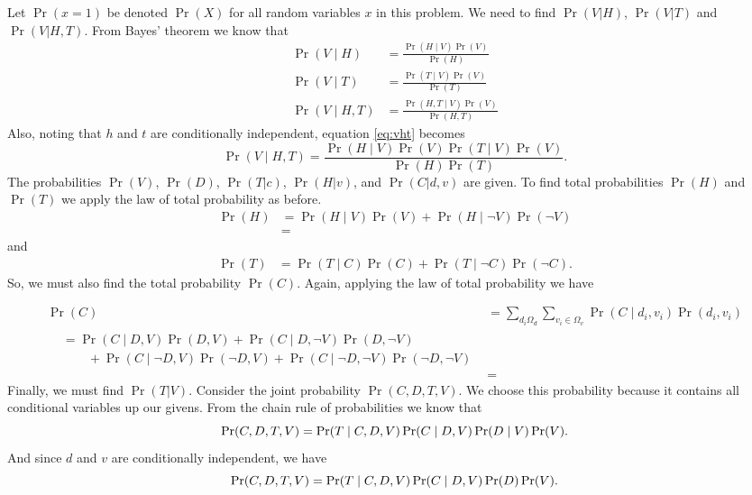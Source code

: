 \documentclass[letterpaper]{amsart}
\begin{document}
Let
$\Pr(x = 1)$
be denoted
$\Pr(X)$
for all random variables $x$ in this problem. We need to find
$\Pr(V| H)$,
$\Pr(V| T)$
and
$\Pr(V| H, T)$.
From Bayes' theorem we know that
\begin{align}
  \Pr(V\mid H) &= \frac{\Pr(H\mid V)\Pr(V)}{\Pr(H)} \\
  \Pr(V\mid T) &= \frac{\Pr(T\mid V)\Pr(V)}{\Pr(T)} \\
  \Pr(V\mid H, T) &= \frac{\Pr(H, T\mid V)\Pr(V)}{\Pr(H,T)} \label{eq:vht}
\end{align}
Also, noting that $h$ and $t$ are conditionally independent, equation \ref{eq:vht} becomes
\begin{equation}
  \Pr(V\mid H, T) = \frac{\Pr(H\mid V)\Pr(V)\Pr(T\mid V)\Pr(V)}{\Pr(H)\Pr(T)}.
\end{equation}
The probabilities
$\Pr(V)$,
$\Pr(D)$,
$\Pr(T|c)$,
$\Pr(H|v)$,
and
$\Pr(C|d,v)$
are given. To find total probabilities $\Pr(H)$ and $\Pr(T)$
we apply the law of total probability as before.
\begin{align*}
  \Pr(H) &= \Pr(H\mid V)\Pr(V) +\Pr(H\mid\neg V)\Pr(\neg V)\\
  &=
\end{align*}
and
\begin{align*}
  \Pr(T) &= \Pr(T\mid C)\Pr(C) +\Pr(T\mid\neg C)\Pr(\neg C).
\end{align*}
So, we must also find the total probability $\Pr(C)$.
Again, applying the law of total probability we have

\begin{align*}
  \Pr(C) &= \sum_{d_i\Omega_d}\sum_{v_i\in\Omega_v}\Pr(C\mid d_i, v_i)\Pr(d_i,v_i) \\
  \begin{split}
    &= \Pr(C\mid D, V)\Pr(D, V)
    + \Pr(C\mid D, \neg V)\Pr(D, \neg V)
    \\
    &\qquad + \Pr(C\mid \neg D, V)\Pr(\neg D, V)
    + \Pr(C\mid \neg D, \neg V)\Pr(\neg D, \neg V)
  \end{split}
  \\
         &=
\end{align*}
Finally, we must find $\Pr(T|V)$. Consider the joint probability $\Pr(C,D,T,V)$.
We choose this probability because it contains all conditional variables up our givens.
From the chain rule of probabilities we know that
\begin{equation*}
  \Pr(C,D,T,V) = \Pr(T\mid C,D,V)\Pr(C\mid D,V)\Pr(D\mid V)\Pr(V). \\
\end{equation*}
And since $d$ and $v$ are conditionally independent, we have
\begin{equation*}
  \Pr(C,D,T,V) = \Pr(T\mid C,D,V)\Pr(C\mid D,V)\Pr(D)\Pr(V). \\
\end{equation*}
\end{document}
